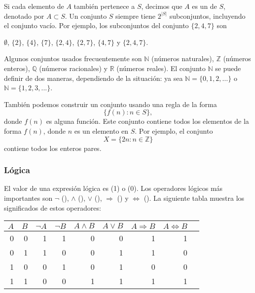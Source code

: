 Si cada elemento de $A$ tambi\'en pertenece a $S$,
decimos que $A$ es un  de $S$,
denotado por $A \subset S$.
Un conjunto $S$ siempre tiene $2^{|S|}$ subconjuntos,
incluyendo el conjunto vac\'io.
Por ejemplo, los subconjuntos del conjunto $\{2,4,7\}$ son
\begin{center}
$\emptyset$,
$\{2\}$, $\{4\}$, $\{7\}$, $\{2,4\}$, $\{2,7\}$, $\{4,7\}$ y $\{2,4,7\}$.
\end{center}

Algunos conjuntos usados frecuentemente son
$\mathbb{N}$ (n\'umeros naturales),
$\mathbb{Z}$ (n\'umeros enteros),
$\mathbb{Q}$ (n\'umeros racionales) y
$\mathbb{R}$ (n\'umeros reales).
El conjunto $\mathbb{N}$
se puede definir de dos maneras, dependiendo
de la situaci\'on:
ya sea $\mathbb{N}=\{0,1,2,\ldots\}$
o $\mathbb{N}=\{1,2,3,...\}$.

Tambi\'en podemos construir un conjunto usando una regla de la forma
\[\{f(n) : n \in S\},\]
donde $f(n)$ es alguna funci\'on.
Este conjunto contiene todos los elementos de la forma $f(n)$,
donde $n$ es un elemento en $S$.
Por ejemplo, el conjunto
\[X=\{2n : n \in \mathbb{Z}\}\]
contiene todos los enteros pares.

\subsubsection{L\'ogica}


El valor de una expresi\'on l\'ogica es
 (1) o  (0).
Los operadores l\'ogicos m\'as importantes son
$\lnot$ (),
$\land$ (),
$\lor$ (),
$\Rightarrow$ () y
$\Leftrightarrow$ ().
La siguiente tabla muestra los significados de estos operadores:

\begin{center}
\begin{tabular}{rr|rrrrrrr}
$A$ & $B$ & $\lnot A$ & $\lnot B$ & $A \land B$ & $A \lor B$ & $A \Rightarrow B$ & $A \Leftrightarrow B$ \\
\hline
0 & 0 & 1 & 1 & 0 & 0 & 1 & 1 \\
0 & 1 & 1 & 0 & 0 & 1 & 1 & 0 \\
1 & 0 & 0 & 1 & 0 & 1 & 0 & 0 \\
1 & 1 & 0 & 0 & 1 & 1 & 1 & 1 \\
\end{tabular}
\end{center}

